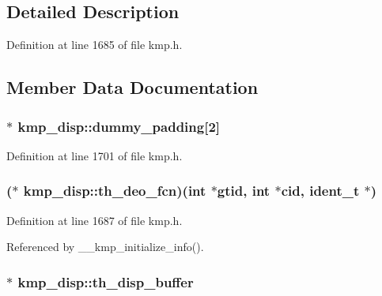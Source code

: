 \subsection{Detailed Description}


Definition at line 1685 of file kmp.\-h.



\subsection{Member Data Documentation}
\hypertarget{structkmp__disp_a2d0804dc17a8f9c75e24d504005595b0}{
\subsubsection[{dummy\-\_\-padding}]{$\ast$ kmp\-\_\-disp\-::dummy\-\_\-padding\mbox{[}2\mbox{]}}}\label{structkmp__disp_a2d0804dc17a8f9c75e24d504005595b0}


Definition at line 1701 of file kmp.\-h.

\hypertarget{structkmp__disp_a34c2a4a67bbbb9a596e8cee765a12467}{
\subsubsection[{th\-\_\-deo\-\_\-fcn}]{($\ast$ kmp\-\_\-disp\-::th\-\_\-deo\-\_\-fcn)({\bf int} $\ast$gtid, {\bf int} $\ast$cid, {\bf ident\-\_\-t} $\ast$)}}\label{structkmp__disp_a34c2a4a67bbbb9a596e8cee765a12467}


Definition at line 1687 of file kmp.\-h.



Referenced by \-\_\-\-\_\-kmp\-\_\-initialize\-\_\-info().

\hypertarget{structkmp__disp_ae9f9d6c19682600e62d7a9d8ab55fe75}{
\subsubsection[{th\-\_\-disp\-\_\-buffer}]{$\ast$ kmp\-\_\-disp\-::th\-\_\-disp\-\_\-buffer}}\label{structkmp__disp_ae9f9d6c19682600e62d7a9d8ab55fe75}


